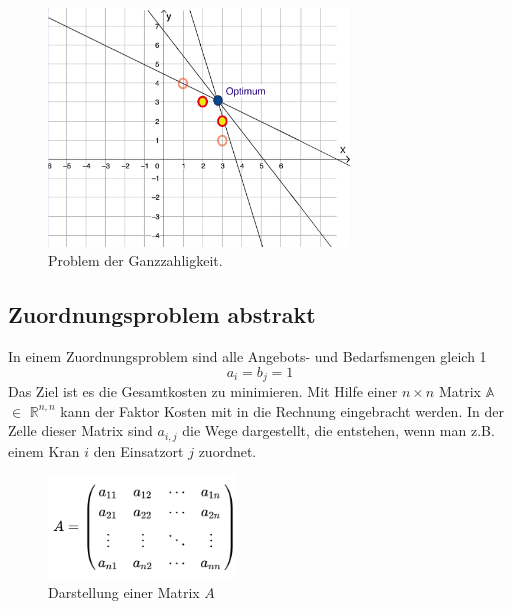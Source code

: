 \begin{figure}
\centering
\includegraphics[width=8cm]{papers/munkres/figures/ganzzahlige_punkte}
\caption{Problem der Ganzzahligkeit.}
\label{munkres:Vr2}
\end{figure}


\subsection{Zuordnungsproblem abstrakt
\label{munkres:subsection:bonorum}}

In einem Zuordnungsproblem sind alle Angebots- und Bedarfsmengen gleich 1 
\begin{equation}
a_{i}=b_{j}=1
\end{equation}
Das Ziel ist es die Gesamtkosten zu minimieren. Mit Hilfe einer $n\times n$ Matrix $\mathbb{A}$ $\mathbb{\in}$ $\mathbb{R}^{n,n}$ kann der Faktor Kosten mit in die Rechnung eingebracht werden.
In der Zelle dieser Matrix sind $a_{i,j}$ die Wege dargestellt, die entstehen, wenn man z.B. einem Kran $i$ den Einsatzort $j$ zuordnet.

\begin{figure}
\centering
\includegraphics[width=5cm]{papers/munkres/figures/MatrixA.png}
\caption{Darstellung einer Matrix $A$}
\label{munkres:Vr2}
\end{figure}


